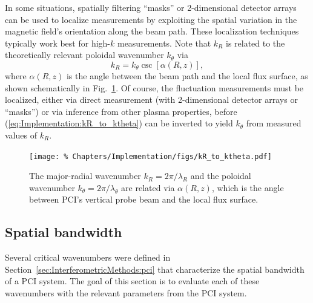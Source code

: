 In some situations, spatially filtering ``masks''
\cite{dorris_rsi09, dorris_phd, lin_rsi06} or
2-dimensional detector arrays
\cite{sanin_rsi04, tanaka_rsi16}
can be used to localize measurements
by exploiting the spatial variation
in the magnetic field's orientation along the beam path.
These localization techniques typically work best
for high-$k$ measurements.
Note that $k_R$ is related to the
theoretically relevant poloidal wavenumber $k_{\theta}$ via
\begin{equation}
  k_R = k_{\theta} \csc[\alpha(R, z)],
  \label{eq:Implementation:kR_to_ktheta}
\end{equation}
where $\alpha(R, z)$ is the angle
between the beam path and the local flux surface,
as shown schematically in
Fig.~\ref{fig:Implementation:relating_kR_to_ktheta}.
Of course, the fluctuation measurements must be localized,
either via direct measurement
(with 2-dimensional detector arrays or ``masks'')
or via inference from other plasma properties,
before (\ref{eq:Implementation:kR_to_ktheta})
can be inverted to yield $k_{\theta}$
from measured values of $k_R$.

\begin{figure}
  \centering
  \texttt{[image: \%
    Chapters/Implementation/figs/kR\_to\_ktheta.pdf]}
  \caption[Relating $k_R$ to $k_{\theta}$]{%
    The major-radial wavenumber $k_R = 2 \pi / \lambda_R$ and
    the poloidal wavenumber $k_{\theta} = 2 \pi / \lambda_{\theta}$
    are related via $\alpha(R, z)$, which
    is the angle between PCI's vertical probe beam and
    the local flux surface.}
\label{fig:Implementation:relating_kR_to_ktheta}
\end{figure}


\subsection{Spatial bandwidth}
\label{sec:Implementation:PCI:spatial_bandwidth}
Several critical wavenumbers were defined in
Section~\ref{sec:InterferometricMethods:pci} that
characterize the spatial bandwidth of a PCI system.
The goal of this section is to evaluate each of these
wavenumbers with the relevant parameters from
the \diiid \space PCI system.

